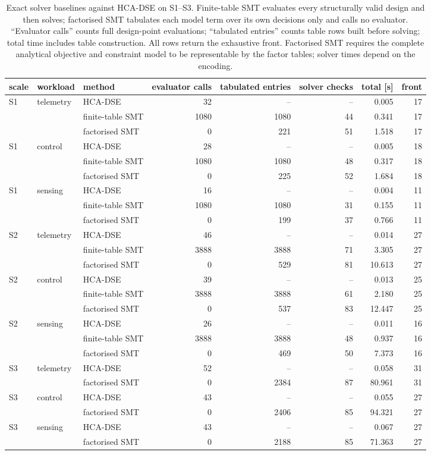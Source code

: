 \documentclass[pdflatex,sn-nature]{sn-jnl}
\theoremstyle{thmstyleone}
\theoremstyle{thmstyletwo}
\theoremstyle{thmstylethree}
\begin{document}
\begin{table}[!htbp]\centering
\caption{Exact solver baselines against HCA-DSE on S1--S3. Finite-table SMT evaluates
every structurally valid design and then solves; factorised SMT tabulates each model term
over its own decisions only and calls no evaluator. ``Evaluator calls'' counts full
design-point evaluations; ``tabulated entries'' counts table rows built before solving;
total time includes table construction. All rows return the exhaustive front.
Factorised SMT requires the complete analytical objective and constraint model to be
representable by the factor tables; solver times depend on the encoding.}\label{tabS5}
{\let\scriptsize\tiny\setlength{\tabcolsep}{2pt}\scriptsize
\begin{tabular}{lllrrrrr}
\toprule
scale & workload & method & evaluator calls & tabulated entries & solver checks & total [s] & front \\
\midrule
S1 & telemetry & HCA-DSE & 32 & -- & -- & 0.005 & 17 \\
 &  & finite-table SMT & 1080 & 1080 & 44 & 0.341 & 17 \\
 &  & factorised SMT & 0 & 221 & 51 & 1.518 & 17 \\
S1 & control & HCA-DSE & 28 & -- & -- & 0.005 & 18 \\
 &  & finite-table SMT & 1080 & 1080 & 48 & 0.317 & 18 \\
 &  & factorised SMT & 0 & 225 & 52 & 1.684 & 18 \\
S1 & sensing & HCA-DSE & 16 & -- & -- & 0.004 & 11 \\
 &  & finite-table SMT & 1080 & 1080 & 31 & 0.155 & 11 \\
 &  & factorised SMT & 0 & 199 & 37 & 0.766 & 11 \\
S2 & telemetry & HCA-DSE & 46 & -- & -- & 0.014 & 27 \\
 &  & finite-table SMT & 3888 & 3888 & 71 & 3.305 & 27 \\
 &  & factorised SMT & 0 & 529 & 81 & 10.613 & 27 \\
S2 & control & HCA-DSE & 39 & -- & -- & 0.013 & 25 \\
 &  & finite-table SMT & 3888 & 3888 & 61 & 2.180 & 25 \\
 &  & factorised SMT & 0 & 537 & 83 & 12.447 & 25 \\
S2 & sensing & HCA-DSE & 26 & -- & -- & 0.011 & 16 \\
 &  & finite-table SMT & 3888 & 3888 & 48 & 0.937 & 16 \\
 &  & factorised SMT & 0 & 469 & 50 & 7.373 & 16 \\
S3 & telemetry & HCA-DSE & 52 & -- & -- & 0.058 & 31 \\
 &  & factorised SMT & 0 & 2384 & 87 & 80.961 & 31 \\
S3 & control & HCA-DSE & 43 & -- & -- & 0.055 & 27 \\
 &  & factorised SMT & 0 & 2406 & 85 & 94.321 & 27 \\
S3 & sensing & HCA-DSE & 43 & -- & -- & 0.067 & 27 \\
 &  & factorised SMT & 0 & 2188 & 85 & 71.363 & 27 \\
\bottomrule
\end{tabular}}
\end{table}
\end{document}

